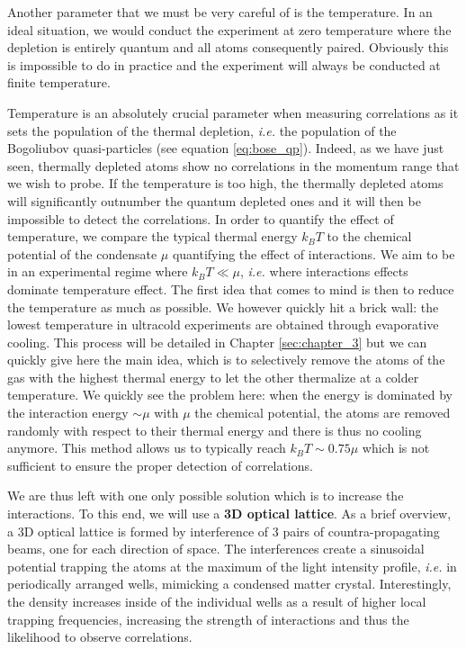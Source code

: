 Another parameter that we must be very careful of is the temperature. In an ideal situation, we would conduct the experiment at zero temperature where the depletion is entirely quantum and all atoms consequently \kmk paired. Obviously this is impossible to do in practice and the experiment will always be conducted at finite temperature.

Temperature is an absolutely crucial parameter when measuring \kmk correlations as it sets the population of the thermal depletion, {\it i.e.} the population of the Bogoliubov quasi-particles (see equation \ref{eq:bose_qp}). Indeed, as we have just seen, thermally depleted atoms show no \kmk correlations in the momentum range that we wish to probe. If the temperature is too high, the thermally depleted atoms will significantly outnumber the quantum depleted ones and it will then be impossible to detect the \kmk correlations. In order to quantify the effect of temperature, we compare the typical thermal energy $k_B T$ to the chemical potential of the condensate $\mu$ quantifying the effect of interactions. We aim to be in an experimental regime where $k_B T \ll \mu$, {\it i.e.} where interactions effects dominate temperature effect. The first idea that comes to mind is then to reduce the temperature as much as possible. We however quickly hit a brick wall: the lowest temperature in ultracold experiments are obtained through evaporative cooling. This process will be detailed in Chapter \ref{sec:chapter_3} but we can quickly give here the main idea, which is to selectively remove the atoms of the gas with the highest thermal energy to let the other thermalize at a colder temperature. We quickly see the problem here: when the energy is dominated by the interaction energy $\sim \mu$ with $\mu$ the chemical potential, the atoms are removed randomly with respect to their thermal energy and there is thus no cooling anymore. This method allows us to typically reach $k_B T \sim 0.75 \mu$ \cite{chang2016} which is not sufficient to ensure the proper detection of \kmk correlations.

We are thus left with one only possible solution which is to increase the interactions. To this end, we will use a \textbf{3D optical lattice}. As a brief overview, a 3D optical lattice is formed by interference of 3 pairs of countra-propagating beams, one for each direction of space. The interferences create a sinusoidal potential trapping the atoms at the maximum of the light intensity profile, {\it i.e.} in periodically arranged wells, mimicking a condensed matter crystal. Interestingly, the density increases inside of the individual wells as a result of higher local trapping frequencies, increasing the strength of interactions and thus the likelihood to observe \kmk correlations.



